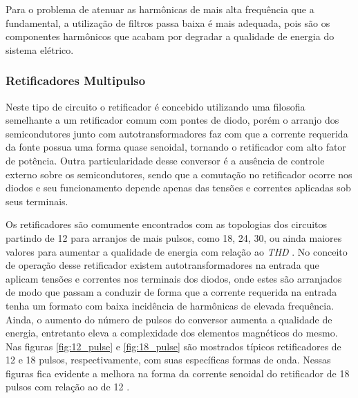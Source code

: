 Para o problema de atenuar as harmônicas de mais alta frequência que a fundamental, a utilização de filtros passa baixa é mais adequada, pois são os componentes harmônicos que acabam por degradar a qualidade de energia do sistema elétrico.

\subsubsection{Retificadores Multipulso}

Neste tipo de circuito o retificador é concebido utilizando uma filosofia semelhante a um retificador comum com pontes de diodo, porém o arranjo dos semicondutores junto com autotransformadores faz com que a corrente requerida da fonte possua uma forma quase senoidal, tornando o retificador com alto fator de potência. Outra particularidade desse conversor é a ausência de controle externo sobre os semicondutores, sendo que a comutação no retificador ocorre nos diodos e seu funcionamento depende apenas das tensões e correntes aplicadas sob seus terminais.

Os retificadores são comumente encontrados com as topologias dos circuitos partindo de 12 para arranjos de mais pulsos, como 18, 24, 30, ou ainda maiores valores para aumentar a qualidade de energia com relação ao \textit{THD} \cite{Singh2008}. No conceito de operação desse retificador existem autotransformadores na entrada que aplicam tensões e correntes nos terminais dos diodos, onde estes são arranjados de modo que passam a conduzir de forma que a corrente requerida na entrada tenha um formato com baixa incidência de harmônicas de elevada frequência. Ainda, o aumento do número de pulsos do conversor aumenta a qualidade de energia, entretanto eleva a complexidade dos elementos magnéticos do mesmo. Nas figuras \ref{fig:12_pulse} e \ref{fig:18_pulse} são mostrados típicos retificadores de 12 e 18 pulsos, respectivamente, com suas específicas formas de onda. Nessas figuras fica evidente a melhora na forma da corrente senoidal do retificador de 18 pulsos com relação ao de 12 \cite{Singh2008}.

